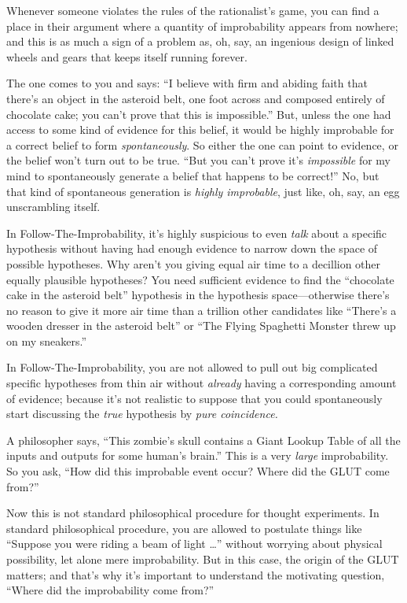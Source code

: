 {
 Whenever someone violates the rules of the
rationalist's game, you can find a place in their
argument where a quantity of improbability appears from nowhere; and
this is as much a sign of a problem as, oh, say, an ingenious design of
linked wheels and gears that keeps itself running forever.}

{
 The one comes to you and says: ``I believe with
firm and abiding faith that there's an object in the
asteroid belt, one foot across and composed entirely of chocolate cake;
you can't prove that this is
impossible.'' But, unless the one had access to some
kind of evidence for this belief, it would be highly improbable for a
correct belief to form \textit{spontaneously}. So either the one can
point to evidence, or the belief won't turn out to be
true. ``But you can't prove
it's \textit{impossible} for my mind to spontaneously
generate a belief that happens to be correct!'' No,
but that kind of spontaneous generation is \textit{highly improbable},
just like, oh, say, an egg unscrambling itself.}

{
 In Follow-The-Improbability, it's highly
suspicious to even \textit{talk} about a specific hypothesis without
having had enough evidence to narrow down the space of possible
hypotheses. Why aren't you giving equal air time to a
decillion other equally plausible hypotheses? You need sufficient
evidence to find the ``chocolate cake in the asteroid
belt'' hypothesis in the hypothesis space---otherwise
there's no reason to give it more air time than a
trillion other candidates like
``There's a wooden dresser in the
asteroid belt'' or ``The Flying
Spaghetti Monster threw up on my sneakers.''}

{
 In Follow-The-Improbability, you are not allowed to pull out big
complicated specific hypotheses from thin air without \textit{already}
having a corresponding amount of evidence; because it's
not realistic to suppose that you could spontaneously start discussing
the \textit{true} hypothesis by \textit{pure coincidence.}}

{
 A philosopher says, ``This
zombie's skull contains a Giant Lookup Table of all the
inputs and outputs for some human's
brain.'' This is a very \textit{large} improbability.
So you ask, ``How did this improbable event occur?
Where did the GLUT come from?''}

{
 Now this is not standard philosophical procedure for thought
experiments. In standard philosophical procedure, you are allowed to
postulate things like ``Suppose you were riding a beam
of light \ldots'' without worrying about physical
possibility, let alone mere improbability. But in this case, the origin
of the GLUT matters; and that's why
it's important to understand the motivating question,
``Where did the improbability come
from?''}

